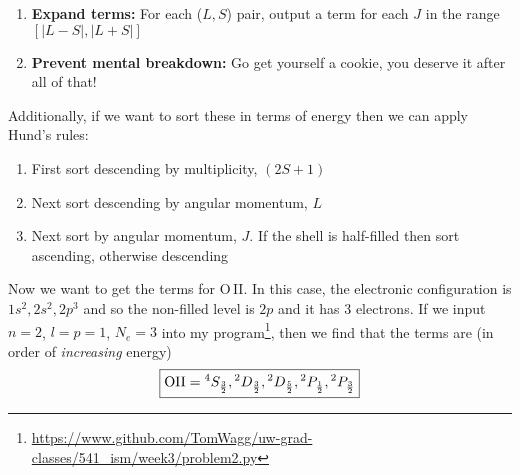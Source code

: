 \documentclass[12pt, letterpaper, twoside]{article}
\begin{document}
{\begin{enumerate}
\begin{enumerate}
            \item Store the pair $(L, S)$ as a possible term
            \item Subtract a unitary matrix - ranging from the $(-L, L)$ rows and from the $(-S, S)$ columns - from the overall matrix
        \end{enumerate}
        \item \textbf{Expand terms:} For each ($L, S$) pair, output a term for each $J$ in the range $[|L - S|, |L + S|]$
        \item \textbf{Prevent mental breakdown:} Go get yourself a cookie, you deserve it after all of that!
    \end{enumerate}
    Additionally, if we want to sort these in terms of energy then we can apply Hund's rules:
    \begin{enumerate}
        \item First sort descending by multiplicity, $(2 S + 1)$
        \item Next sort descending by angular momentum, $L$
        \item Next sort by angular momentum, $J$. If the shell is half-filled then sort ascending, otherwise descending
    \end{enumerate}
    Now we want to get the terms for O\,II. In this case, the electronic configuration is $1 s^2, 2s^2, 2p^3$ and so the non-filled level is $2p$ and it has $3$ electrons. If we input $n = 2$, $l = p = 1$, $N_e = 3$ into my program\footnote{\url{https://www.github.com/TomWagg/uw-grad-classes/541_ism/week3/problem2.py}}, then we find that the terms are (in order of \emph{increasing} energy)
    \begin{equation}
        \boxed{ {\rm O II} = {}^{4} S_{\frac{3}{2}}, {}^{2}D_{\frac{3}{2}}, {}^{2} D_{\frac{5}{2}}, {}^{2} P_{\frac{1}{2}}, {}^{2} P_{\frac{3}{2}} }
    \end{equation} 
}
\end{document}

